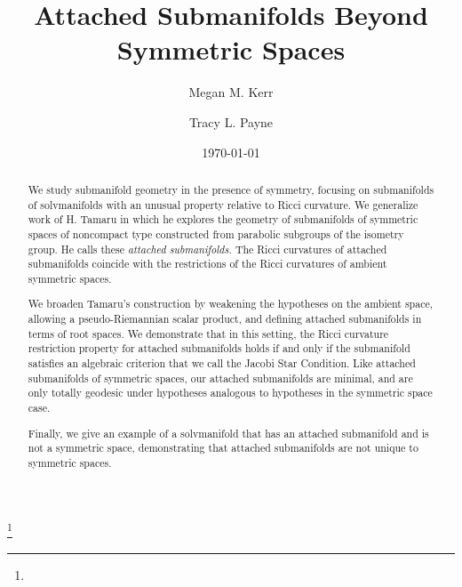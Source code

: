 \documentclass[12pt]{amsart}
\theoremstyle{plain}
\theoremstyle{definition}
\theoremstyle{remark}
\numberwithin{equation}{section}
\numberwithin{theorem}{section}
\begin{document}
\title[Attached Submanifolds Beyond Symmetric Spaces]{Attached Submanifolds Beyond Symmetric Spaces}

\thanks{} 

\author[M. M. Kerr]{Megan M. Kerr }
\address{Department of Mathematics, Wellesley College, 106 Central St.,
Wellesley, MA 02481} 
%
\author[T. L. Payne]{Tracy L. Payne  }
\address{Department of Mathematics and Statistics,  Idaho State University, 
Pocatello, ID 83209-8085} 
\date{\today}


\begin{abstract} We study submanifold geometry in the presence
of symmetry, focusing on  submanifolds of solvmanifolds with an
unusual property relative to Ricci curvature.   We generalize
work  of H. Tamaru  \cite{tamaru-11} in which he explores the
geometry of submanifolds of symmetric spaces of noncompact type
constructed from parabolic subgroups of  the isometry group.  
He calls these {\em attached submanifolds.}
The Ricci curvatures of attached submanifolds coincide with the
restrictions of the Ricci curvatures of  ambient symmetric
spaces. 

We broaden Tamaru's construction by  weakening the hypotheses
on the  ambient space, allowing  a pseudo-Riemannian scalar
product, and defining attached submanifolds in terms of root
spaces.  
 We demonstrate that in this setting, the Ricci curvature
 restriction property for attached submanifolds holds if and
 only if the submanifold satisfies an algebraic criterion that
 we call the Jacobi Star Condition.
Like  attached submanifolds of symmetric spaces, our attached
submanifolds are minimal, and are only totally geodesic under
hypotheses analogous to hypotheses in the symmetric space case.

Finally, we give an example of a solvmanifold that has  an attached submanifold  and is not a symmetric space, 
demonstrating that attached submanifolds are not unique to symmetric spaces. 
\end{abstract}
\maketitle
\end{document}
